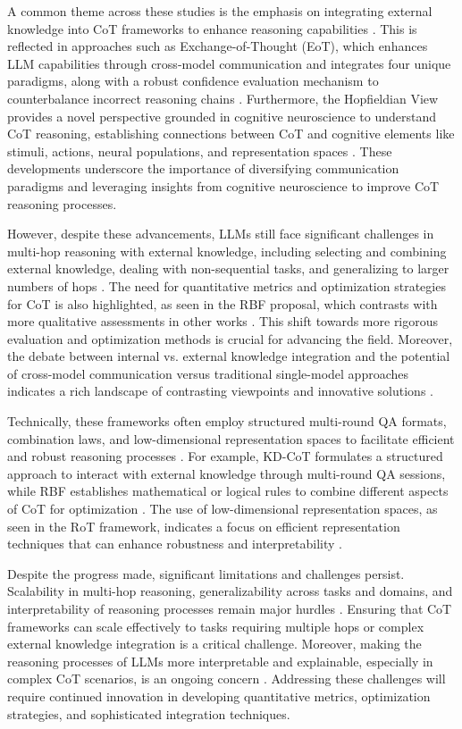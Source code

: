 \documentclass[conference]{IEEEtran}
\begin{document}
A common theme across these studies is the emphasis on integrating external knowledge into CoT frameworks to enhance reasoning capabilities \cite{b5}. This is reflected in approaches such as Exchange-of-Thought (EoT), which enhances LLM capabilities through cross-model communication and integrates four unique paradigms, along with a robust confidence evaluation mechanism to counterbalance incorrect reasoning chains \cite{b6}. Furthermore, the Hopfieldian View provides a novel perspective grounded in cognitive neuroscience to understand CoT reasoning, establishing connections between CoT and cognitive elements like stimuli, actions, neural populations, and representation spaces \cite{b7}. These developments underscore the importance of diversifying communication paradigms and leveraging insights from cognitive neuroscience to improve CoT reasoning processes.

However, despite these advancements, LLMs still face significant challenges in multi-hop reasoning with external knowledge, including selecting and combining external knowledge, dealing with non-sequential tasks, and generalizing to larger numbers of hops \cite{b8}. The need for quantitative metrics and optimization strategies for CoT is also highlighted, as seen in the RBF proposal, which contrasts with more qualitative assessments in other works \cite{b9}. This shift towards more rigorous evaluation and optimization methods is crucial for advancing the field. Moreover, the debate between internal vs. external knowledge integration and the potential of cross-model communication versus traditional single-model approaches indicates a rich landscape of contrasting viewpoints and innovative solutions \cite{b10}.

Technically, these frameworks often employ structured multi-round QA formats, combination laws, and low-dimensional representation spaces to facilitate efficient and robust reasoning processes \cite{b11}. For example, KD-CoT formulates a structured approach to interact with external knowledge through multi-round QA sessions, while RBF establishes mathematical or logical rules to combine different aspects of CoT for optimization \cite{b12}. The use of low-dimensional representation spaces, as seen in the RoT framework, indicates a focus on efficient representation techniques that can enhance robustness and interpretability \cite{b13}.

Despite the progress made, significant limitations and challenges persist. Scalability in multi-hop reasoning, generalizability across tasks and domains, and interpretability of reasoning processes remain major hurdles \cite{b14}. Ensuring that CoT frameworks can scale effectively to tasks requiring multiple hops or complex external knowledge integration is a critical challenge. Moreover, making the reasoning processes of LLMs more interpretable and explainable, especially in complex CoT scenarios, is an ongoing concern \cite{b15}. Addressing these challenges will require continued innovation in developing quantitative metrics, optimization strategies, and sophisticated integration techniques.
\end{document}
